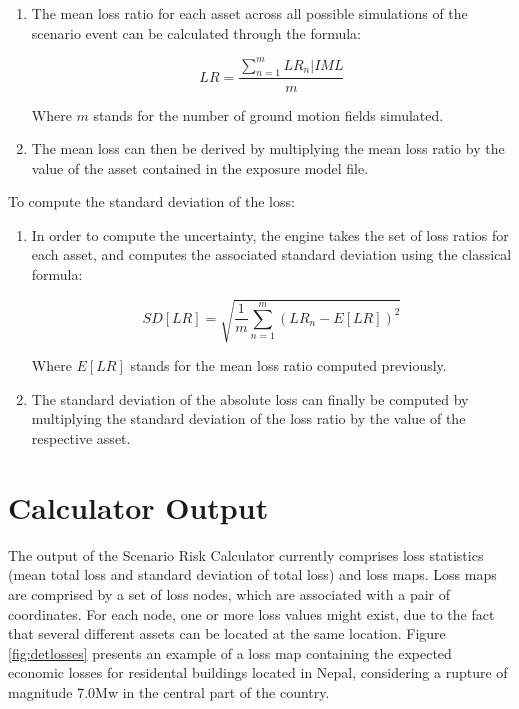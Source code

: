 \begin{enumerate}
\begin{itemize}
\end{itemize}

\item The mean loss ratio for each \gls{asset} across all possible simulations of the scenario event can be calculated through the formula:

\begin{equation}
LR=\frac{\sum^m_{n=1}LR_n|IML}{m}
\end{equation}

Where $m$ stands for the number of ground motion fields simulated.

\item The mean loss can then be derived by multiplying the mean loss ratio by the value of the \gls{asset} contained in the \gls{exposure model} file.

\end{enumerate}

To compute the standard deviation of the loss:

\begin{enumerate}

\item In order to compute the uncertainty, the engine takes the set of loss ratios for each \gls{asset}, and computes the associated standard deviation using the classical formula:

\begin{equation}
SD[LR]=\sqrt{  \frac{1}{m}\sum_{n=1}^m{(LR_n-E[LR])^2} }
\end{equation}

Where $E[LR]$ stands for the mean loss ratio computed previously.

\item The standard deviation of the absolute loss can finally be computed by multiplying the standard deviation of the loss ratio by the value of the respective \gls{asset}.

\end{enumerate}

\section{Calculator Output}
The output of the Scenario Risk Calculator currently comprises loss statistics (mean total loss and standard deviation of total loss) and loss maps. Loss maps are comprised by a set of loss nodes, which are associated with a pair of coordinates. For each node, one or more loss values might exist, due to the fact that several different \glspl{asset} can be located at the same location.  Figure \ref{fig:detlosses} presents an example of a loss map containing the expected economic losses for residental buildings located in Nepal, considering a rupture of magnitude 7.0Mw in the central part of the country.

